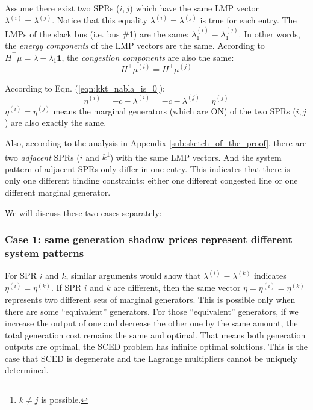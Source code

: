 \documentclass[letterpaper, 11pt]{article}
\theoremstyle{plain}
\theoremstyle{definition}
\begin{document}
Assume there exist two SPRs ($i,j$) which have the same LMP vector $\lambda^{(i)} = \lambda^{(j)}$.
Notice that this equality $\lambda^{(i)} = \lambda^{(j)}$ is true for each entry. The LMPs of the slack bus (i.e. bus \#1) are the same: $\lambda_1^{(i)} = \lambda_1^{(j)}$. In other words, the \emph{energy components} of the LMP vectors are the same. According to $H^\intercal \mu = \lambda - \lambda_1 \mathbf{1}$, the \emph{congestion components} are also the same:
\begin{equation}
H^\intercal \mu^{(i)} = H^\intercal \mu^{(j)}
\end{equation}

According to Eqn. (\ref{eqn:kkt_nabla_is_0}):
\begin{equation}
\label{eqn:multiplier_gen} 
  \eta^{(i)} =  -c - \lambda^{(i)} = -c - \lambda^{(j)} = \eta^{(j)}
\end{equation}
$\eta^{(i)} = \eta^{(j)} $ means the marginal generators (which are ON) of the two SPRs ($i,j$) are also exactly the same.

Also, according to the analysis in Appendix \ref{sub:sketch_of_the_proof}, there are two \emph{adjacent} SPRs ($i$ and $k$\footnote{$k\ne j$ is possible.}) with the same LMP vectors. And the system pattern of adjacent SPRs only differ in one entry. This indicates that there is only one different binding constraints: either one different congested line or one different marginal generator.

We will discuss these two cases separately:



\subsubsection{Case 1: same generation shadow prices represent different system patterns} \label{ssub:case1_same_trans_diff_gen}
For SPR $i$ and $k$, similar arguments would show that $\lambda^{(i)} = \lambda^{(k)}$ indicates $\eta^{(i)} = \eta^{(k)}$. If SPR $i$ and $k$ are different, then the same vector $\eta = \eta^{(i)} = \eta^{(k)}$ represents two different sets of marginal generators. This is possible only when there are some ``equivalent'' generators. For those ``equivalent'' generators, if we increase the output of one and decrease the other one by the same amount, the total generation cost remains the same and optimal. That means both generation outputs are optimal, the SCED problem has infinite optimal solutions. This is the case that SCED is degenerate and the Lagrange multipliers cannot be uniquely determined.
\end{document}
